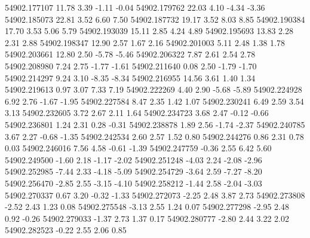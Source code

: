 54902.177107       11.78        3.39       -1.11       -0.04
54902.179762       22.03        4.10       -4.34       -3.36
54902.185073       22.81        3.52        6.60        7.50
54902.187732       19.17        3.52        8.03        8.85
54902.190384       17.70        3.53        5.06        5.79
54902.193039       15.11        2.85        4.24        4.89
54902.195693       13.83        2.28        2.31        2.88
54902.198347       12.90        2.57        1.67        2.16
54902.201003        5.11        2.48        1.38        1.78
54902.203661       12.80        2.50       -5.78       -5.46
54902.206322        7.87        2.61        2.54        2.78
54902.208980        7.24        2.75       -1.77       -1.61
54902.211640        0.08        2.50       -1.79       -1.70
54902.214297        9.24        3.10       -8.35       -8.34
54902.216955       14.56        3.61        1.40        1.34
54902.219613        0.97        3.07        7.33        7.19
54902.222269        4.40        2.90       -5.68       -5.89
54902.224928        6.92        2.76       -1.67       -1.95
54902.227584        8.47        2.35        1.42        1.07
54902.230241        6.49        2.59        3.54        3.13
54902.232605        3.72        2.67        2.11        1.64
54902.234723        3.68        2.47       -0.12       -0.66
54902.236801        1.24        2.31        0.28       -0.31
54902.238878        1.89        2.56       -1.74       -2.37
54902.240785        3.67        2.27       -0.68       -1.35
54902.242534        2.60        2.57        1.52        0.80
54902.244276        0.86        2.31        0.78        0.03
54902.246016        7.56        4.58       -0.61       -1.39
54902.247759       -0.36        2.55        6.42        5.60
54902.249500       -1.60        2.18       -1.17       -2.02
54902.251248       -4.03        2.24       -2.08       -2.96
54902.252985       -7.44        2.33       -4.18       -5.09
54902.254729       -3.64        2.59       -7.27       -8.20
54902.256470       -2.85        2.55       -3.15       -4.10
54902.258212       -1.44        2.58       -2.04       -3.03
54902.270337        0.67        3.20       -0.32       -1.33
54902.272073       -2.25        2.48        3.87        2.73
54902.273808       -2.52        2.43        1.23        0.08
54902.275548       -3.13        2.55        1.24        0.07
54902.277298       -2.95        2.48        0.92       -0.26
54902.279033       -1.37        2.73        1.37        0.17
54902.280777       -2.80        2.44        3.22        2.02
54902.282523       -0.22        2.55        2.06        0.85

